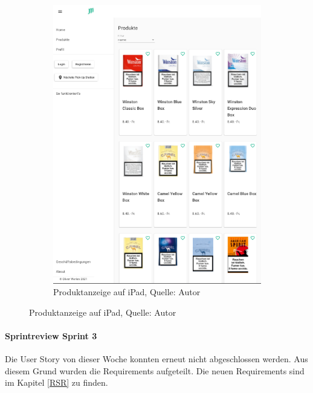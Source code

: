 \begin{figure}[H]
\begin{subfigure}[b]{0.5\textwidth}
		\includegraphics[scale=0.5]{images/productsTablet.PNG}
		\caption[Produktanzeige auf iPad]{Produktanzeige auf iPad, Quelle: Autor}
		\label{img: Products iPad}
	\end{subfigure}
\end{figure} 

\paragraph{Sprintreview Sprint 3}
Die \gls{User Story} von dieser Woche konnten erneut nicht abgeschlossen werden. Aus diesem Grund wurden die Requirements aufgeteilt. Die neuen Requirements sind im Kapitel \ref{RSR} zu finden. 

